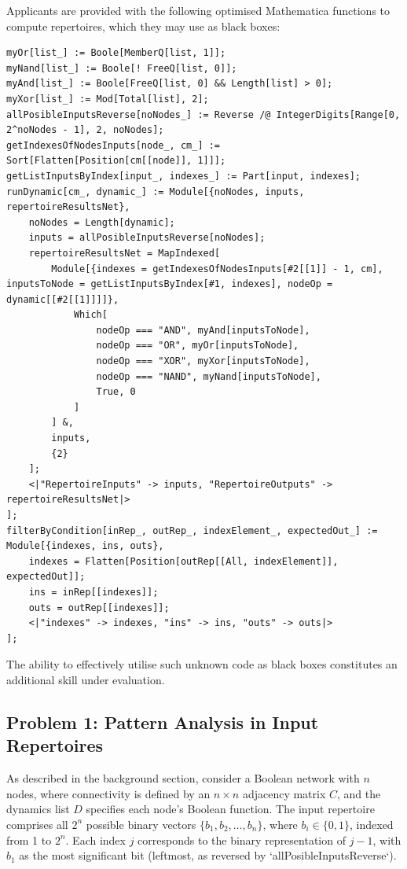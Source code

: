 \documentclass[12pt]{article}
\begin{document}
Applicants are provided with the following optimised Mathematica functions to compute repertoires, which they may use as black boxes:
\begin{lstlisting}[caption={Optimised Mathematica Functions for Repertoire Computation}]
myOr[list_] := Boole[MemberQ[list, 1]];
myNand[list_] := Boole[! FreeQ[list, 0]];
myAnd[list_] := Boole[FreeQ[list, 0] && Length[list] > 0];
myXor[list_] := Mod[Total[list], 2];
allPosibleInputsReverse[noNodes_] := Reverse /@ IntegerDigits[Range[0, 2^noNodes - 1], 2, noNodes];
getIndexesOfNodesInputs[node_, cm_] := Sort[Flatten[Position[cm[[node]], 1]]];
getListInputsByIndex[input_, indexes_] := Part[input, indexes];
runDynamic[cm_, dynamic_] := Module[{noNodes, inputs, repertoireResultsNet},
    noNodes = Length[dynamic];
    inputs = allPosibleInputsReverse[noNodes];
    repertoireResultsNet = MapIndexed[
        Module[{indexes = getIndexesOfNodesInputs[#2[[1]] - 1, cm], inputsToNode = getListInputsByIndex[#1, indexes], nodeOp = dynamic[[#2[[1]]]]},
            Which[
                nodeOp === "AND", myAnd[inputsToNode],
                nodeOp === "OR", myOr[inputsToNode],
                nodeOp === "XOR", myXor[inputsToNode],
                nodeOp === "NAND", myNand[inputsToNode],
                True, 0
            ]
        ] &,
        inputs,
        {2}
    ];
    <|"RepertoireInputs" -> inputs, "RepertoireOutputs" -> repertoireResultsNet|>
];
filterByCondition[inRep_, outRep_, indexElement_, expectedOut_] := Module[{indexes, ins, outs},
    indexes = Flatten[Position[outRep[[All, indexElement]], expectedOut]];
    ins = inRep[[indexes]];
    outs = outRep[[indexes]];
    <|"indexes" -> indexes, "ins" -> ins, "outs" -> outs|>
];
\end{lstlisting}
The ability to effectively utilise such unknown code as black boxes constitutes an additional skill under evaluation.

\subsection{Problem 1: Pattern Analysis in Input Repertoires}
As described in the background section, consider a Boolean network with \( n \) nodes, where connectivity is defined by an \( n \times n \) adjacency matrix \( C \), and the dynamics list \( D \) specifies each node’s Boolean function. The input repertoire comprises all \( 2^n \) possible binary vectors \( \{b_1, b_2, \dots, b_n\} \), where \( b_i \in \{0, 1\} \), indexed from 1 to \( 2^n \). Each index \( j \) corresponds to the binary representation of \( j-1 \), with \( b_1 \) as the most significant bit (leftmost, as reversed by `allPosibleInputsReverse`).
\end{document}
